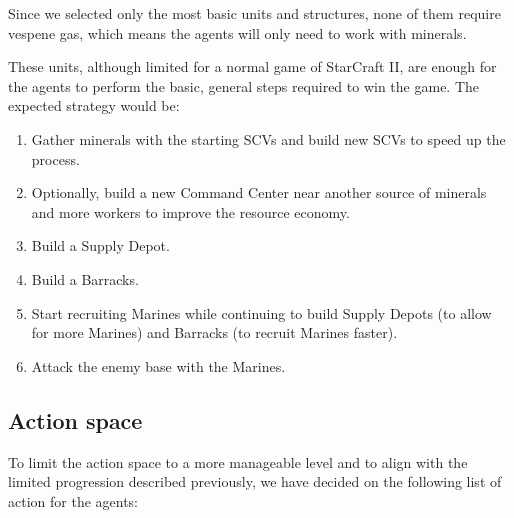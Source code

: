 Since we selected only the most basic units and structures, none of them require vespene gas, which means the agents will only need to work with minerals.

These units, although limited for a normal game of StarCraft II, are enough for the agents to perform the basic, general steps required to win the game. The expected strategy would be:

\begin{enumerate}
    \item Gather minerals with the starting SCVs and build new SCVs to speed up the process.
    \item Optionally, build a new Command Center near another source of minerals and more workers to improve the resource economy.
    \item Build a Supply Depot.
    \item Build a Barracks.
    \item Start recruiting Marines while continuing to build Supply Depots (to allow for more Marines) and Barracks (to recruit Marines faster).
    \item Attack the enemy base with the Marines.
\end{enumerate}

\subsection{Action space}
\label{sec:action_space}

To limit the action space to a more manageable level and to align with the limited progression described previously, we have decided on the following list of action for the agents:

